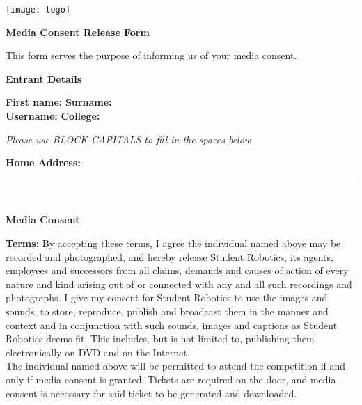 \documentclass[a4paper,10pt]{article}
\newcommand{\textfield}[1]{\textbf{#1:} \hrulefill\hspace{0mm}}
\newcommand{\textfieldblank}[1]{\textbf{#1:} \hfill\hspace{0mm}}
\newcommand{\fieldsep}{\\[2.5mm]}
\newcommand{\textfieldline}{{\hrule\hspace{2mm}\fieldsep}}
\begin{document}
\pagestyle{empty}

\begin{minipage}[c]{0.38\textwidth}
\texttt{[image: logo]}
\end{minipage}
\hspace{0.12\textwidth}
\begin{minipage}[c]{0.48\textwidth}
\begin{center}
{\LARGE \textbf{Media Consent Release Form} \par}
\end{center}
\end{minipage}
\vspace{1cm}

This form serves the purpose of informing us of your media consent.

\vspace{2mm}
\textbf{\large Entrant Details}\\\vspace{-2mm}

\textfieldblank{First name}  \textfieldblank{Surname} \fieldsep
\textfieldblank{Username} \textfieldblank{College} \fieldsep
\begin{center}
\textit{Please use BLOCK CAPITALS to fill in the spaces below}
\end{center}
\textfield{Home Address} \fieldsep
\textfieldline


\textbf{\large Media Consent}\\\vspace{-3mm}

\textbf{Terms:} By accepting these terms, I agree the individual named above may be recorded and photographed, and hereby release Student Robotics, its agents, employees and successors from all claims, demands and causes of action of every nature and kind arising out of or connected with any and all such recordings and photographs.
I give my consent for Student Robotics to use the images and sounds, to store, reproduce, publish and broadcast them in the manner and context and in conjunction with such sounds, images and captions as Student Robotics deems fit.
This includes, but is not limited to, publishing them electronically on DVD and on the Internet.\\

The individual named above will be permitted to attend the competition if and only if media consent is granted.
Tickets are required on the door, and media consent is necessary for said ticket to be generated and downloaded.\\
\end{document}
